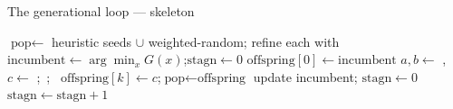 \documentclass[aspectratio=169,t]{beamer}
\begin{document}
\begin{frame}{The generational loop --- skeleton}
  \footnotesize
  \begin{algorithmic}[1]
    \State $\text{pop} \gets$ heuristic seeds $\cup$ weighted-random; refine each with 
    \State $\text{incumbent} \gets \arg\min_x G(x)$;\quad $\text{stagn} \gets 0$
      \State $\text{offspring}[0] \gets \text{incumbent}$ 
      \State $a,b \gets$ ,  
      \State $c \gets$ ;\ ;\ 
      \State $\text{offspring}[k] \gets c$;\quad $\text{pop} \gets \text{offspring}$
        \State update incumbent; $\text{stagn}\gets 0$
      \Else
        \State $\text{stagn}\gets\text{stagn}+1$
      \EndIf
        \State {}
      \EndIf
    \EndFor
    \State \Return {} 
  \end{algorithmic}
\end{frame}
\end{document}
